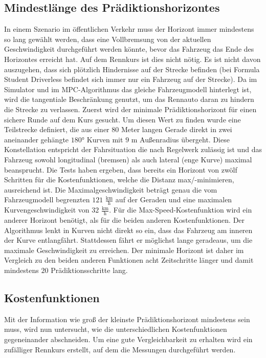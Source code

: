 \documentclass{like}
\begin{document}
\subsection{Mindestlänge des Prädiktionshorizontes} 
In einem Szenario im öffentlichen Verkehr muss der Horizont immer mindestens so lang gewählt werden, dass eine Vollbremsung von der aktuellen Geschwindigkeit durchgeführt werden könnte, bevor das Fahrzeug das Ende des Horizontes erreicht hat. Auf dem Rennkurs ist dies nicht nötig. Es ist nicht davon auszugehen, dass sich plötzlich Hindernisse auf der Strecke befinden (bei Formula Student Driverless befindet sich immer nur ein Fahrzeug auf der Strecke). Da im Simulator und im \ac{MPC}-Algorithmus das gleiche Fahrzeugmodell hinterlegt ist, wird die tangentiale Beschränkung genutzt, um das Rennauto daran zu hindern die Strecke zu verlassen.
Zuerst wird der minimale Prädiktionshorizont für einen sichere Runde auf dem Kurs gesucht. Um diesen Wert zu finden wurde eine Teilstrecke definiert, die aus einer $80$ Meter langen Gerade direkt in zwei aneinander gehängte $180$° Kurven mit $9$ m Außenradius übergeht. Diese Konstellation entspricht der Fahrsituation die nach Regelwerk zulässig ist und das Fahrzeug sowohl longitudinal (bremsen) als auch lateral (enge Kurve) maximal beansprucht. Die Tests haben ergeben, dass bereits ein Horizont von zwölf Schritten für die Kostenfunktionen, welche die Distanz max/-minimieren, ausreichend ist. Die Maximalgeschwindigkeit beträgt genau die vom Fahrzeugmodell begrenzten $121$ $\frac{\text{km}}{\text{h}}$ auf der Geraden und eine maximalen Kurven\-ge\-schwin\-dig\-keit von $32$ $\frac{\text{km}}{\text{h}}$. 
Für die Max-Speed-Kostenfunktion wird ein anderer Horizont benötigt, als für die beiden anderen Kostenfunktionen. Der Algorithmus lenkt in Kurven nicht direkt so ein, dass das Fahrzeug am inneren der Kurve entlangfährt. Stattdessen fährt er möglichst lange geradeaus, um die maximale Geschwindigkeit zu erreichen. Der minimale Horizont ist daher im Vergleich zu den beiden anderen Funktionen acht Zeitschritte länger und damit mindestens $20$ Prädiktionsschritte lang.


\subsection{Kostenfunktionen}
Mit der Information wie groß der kleinste Prädiktionshorizont mindestens sein muss, wird nun untersucht, wie die unterschiedlichen Kostenfunktionen gegeneinander abschneiden. Um eine gute Vergleichbarkeit zu erhalten wird ein zufälliger Rennkurs erstellt, auf dem die Messungen durchgeführt werden. 
\end{document}
